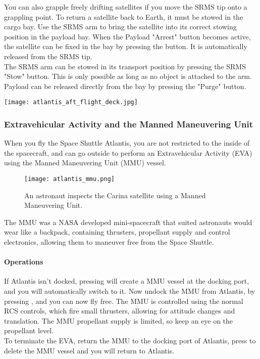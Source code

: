 \documentclass[Orbiter User Manual.tex]{subfiles}
\begin{document}
You can also grapple freely drifting satellites if you move the SRMS tip onto a grappling point. To return a satellite back to Earth, it must be stowed in the cargo bay. Use the SRMS arm to bring the satellite into its correct stowing position in the payload bay. When the Payload "Arrest" button becomes active, the satellite can be fixed in the bay by pressing the button. It is automatically released from the SRMS tip.\\

The SRMS arm can be stowed in its transport position by pressing the SRMS "Stow" button. This is only possible as long as no object is attached to the arm. Payload can be released directly from the bay by pressing the "Purge" button.
\begin{center}
\texttt{[image: atlantis\_aft\_flight\_deck.jpg]}
\end{center}


\subsubsection{Extravehicular Activity and the Manned Maneuvering Unit}
When you fly the Space Shuttle Atlantis, you are not restricted to the inside of the spacecraft, and can go outside to perform an Extravehicular Activity (EVA) using the Manned Maneuvering Unit (MMU) vessel.

\begin{figure}[H]
	\centering
	\texttt{[image: atlantis\_mmu.png]}
	\caption{An astronaut inspects the Carina satellite using a Manned Maneuvering Unit.}
\end{figure}

\noindent
The MMU was a NASA developed mini-spacecraft that suited astronauts would wear like a backpack, containing thrusters, propellant supply and control electronics, allowing them to maneuver free from the Space Shuttle.

\paragraph{Operations}
If Atlantis isn't docked, pressing  will create a MMU vessel at the docking port, and you will automatically switch to it. Now undock the MMU from Atlantis, by pressing \Ctrl{}, and you can now fly free. The MMU is controlled using the normal RCS controls, which fire small thrusters, allowing for attitude changes and translation. The MMU propellant supply is limited, so keep an eye on the propellant level. \\
To terminate the EVA, return the MMU to the docking port of Atlantis, press  to delete the MMU vessel and you will return to Atlantis.
\end{document}
